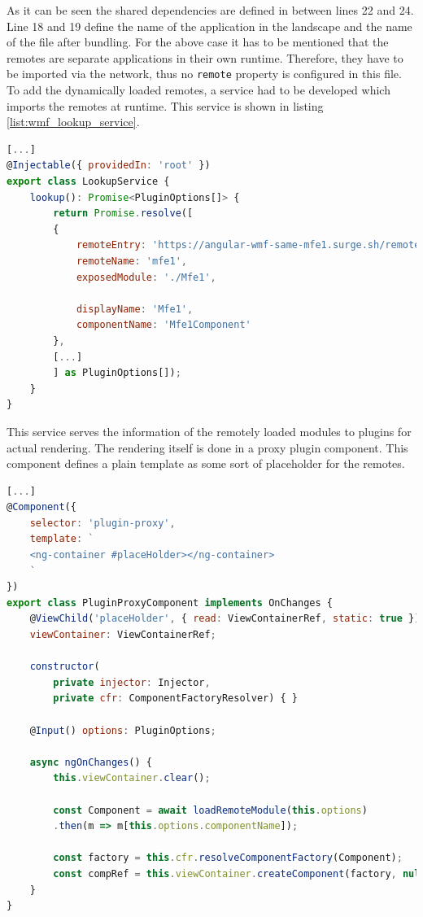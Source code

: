 As it can be seen the shared dependencies are defined in between lines 22 and 24. Line 18 and 19 define the name of the application in the landscape and the name of the file after bundling. For the above case it has to be mentioned that the remotes are separate applications in their own runtime. Therefore, they have to be imported via the network, thus no \texttt{remote} property is configured in this file. To add the dynamically loaded remotes, a service had to be developed which imports the remotes at runtime. This service is shown in listing \ref{list:wmf_lookup_service}.\cite{wmf_angular_dynamicfederation}

\begin{lstlisting}[language=JavaScript, caption=Content of \texttt{lookup.service.ts} for remote module loading in shell applications, label=list:wmf_lookup_service, xleftmargin=.05\textwidth, xrightmargin=.05\textwidth]
[...]
@Injectable({ providedIn: 'root' })
export class LookupService {
	lookup(): Promise<PluginOptions[]> {
		return Promise.resolve([
		{
			remoteEntry: 'https://angular-wmf-same-mfe1.surge.sh/remoteEntry.js',
			remoteName: 'mfe1',
			exposedModule: './Mfe1',
			
			displayName: 'Mfe1',
			componentName: 'Mfe1Component'
		},
		[...]	
		] as PluginOptions[]);
	}
}
\end{lstlisting}

This service serves the information of the remotely loaded modules to plugins for actual rendering. The rendering itself is done in a proxy plugin component. This component defines a plain template as some sort of placeholder for the remotes. \cite{wmf_angular_dynamicfederation}
\newpage
\begin{lstlisting}[language=JavaScript, caption=Content of \texttt{plugin-proxy.component.ts} for remote module loading in shell applications, label=list:wmf_pluginproxy, xleftmargin=.05\textwidth, xrightmargin=.05\textwidth]
[...]	
@Component({
	selector: 'plugin-proxy',
	template: `
	<ng-container #placeHolder></ng-container>
	`
})
export class PluginProxyComponent implements OnChanges {
	@ViewChild('placeHolder', { read: ViewContainerRef, static: true })
	viewContainer: ViewContainerRef;
	
	constructor(
		private injector: Injector,
		private cfr: ComponentFactoryResolver) { }
	
	@Input() options: PluginOptions;
	
	async ngOnChanges() {
		this.viewContainer.clear();
		
		const Component = await loadRemoteModule(this.options)
		.then(m => m[this.options.componentName]);
		
		const factory = this.cfr.resolveComponentFactory(Component);
		const compRef = this.viewContainer.createComponent(factory, null, this.injector);		
	}
}
\end{lstlisting}

